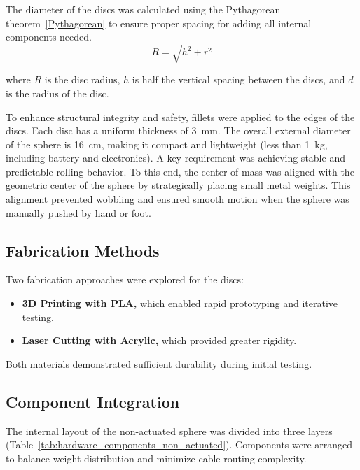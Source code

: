 \documentclass[english, bachelor, utf8]{base/thesis_telematics}
\begin{document}
The diameter of the discs was calculated using the Pythagorean theorem~\ref{Pythagorean} to ensure proper spacing for adding all internal components needed.
\begin{equation}
    R = \sqrt{h^2 + r^2} \label{Pythagorean}
\end{equation}


\noindent
where $R$ is the disc radius, $h$ is half the vertical spacing between the discs, and $d$ is the radius of the disc.

To enhance structural integrity and safety, fillets were applied to the edges of the discs. 
Each disc has a uniform thickness of \SI{3}{\milli\meter}.
The overall external diameter of the sphere is \SI{16}{\centi\meter}, making it compact and lightweight (less than \SI{1}{\kilo\gram}, including battery and electronics).
A key requirement was achieving stable and predictable rolling behavior. 
To this end, the center of mass was aligned with the geometric center of the sphere by strategically placing small metal weights. 
This alignment prevented wobbling and ensured smooth motion when the sphere was manually pushed by hand or foot.

\subsection{Fabrication Methods}
Two fabrication approaches were explored for the discs:
\begin{itemize}
    \item \textbf{3D Printing with PLA,} which enabled rapid prototyping and iterative testing.
    \item \textbf{Laser Cutting with Acrylic,} which provided greater rigidity.
\end{itemize}
Both materials demonstrated sufficient durability during initial testing.

\subsection{Component Integration}
The internal layout of the non-actuated sphere was divided into three layers (Table~\ref{tab:hardware_components_non_actuated}).
Components were arranged to balance weight distribution and minimize cable routing complexity.
\end{document}
